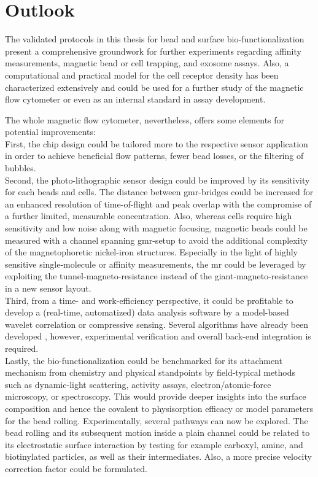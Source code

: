 \chapter{Outlook}
The validated protocols in this thesis for bead and surface bio-functionalization present a comprehensive groundwork for further experiments regarding affinity measurements, magnetic bead or cell trapping, and exosome assays. Also, a computational and practical model for the cell receptor density has been characterized extensively and could be used for a further study of the magnetic flow cytometer or even as an internal standard in assay development. 

The whole magnetic flow cytometer, nevertheless, offers some elements for potential improvements: \\
First, the chip design could be tailored more to the respective sensor application in order to achieve beneficial flow patterns, fewer bead losses, or the filtering of bubbles.\\
Second, the photo-lithographic sensor design could be improved by its sensitivity for each beads and cells. The distance between \gls{gmr}-bridges could be increased for an enhanced resolution of time-of-flight and peak overlap with the compromise of a further limited, measurable concentration. Also, whereas cells require high sensitivity and low noise along with magnetic focusing, magnetic beads could be measured with a channel spanning \gls{gmr}-setup to avoid the additional complexity of the magnetophoretic nickel-iron structures. Especially in the light of highly sensitive single-molecule or affinity measurements, the \acrlong{mr} could be leveraged by exploiting the tunnel-magneto-resistance instead of the giant-magneto-resistance in a new sensor layout.\cite{lit:GMRTMR}\\
Third, from a time- and work-efficiency perspective, it could be profitable to develop a (real-time, automatized) data analysis software by a model-based wavelet correlation or compressive sensing. Several algorithms have already been developed \cite{lit:thes:michaelBauer}, however, experimental verification and overall back-end integration is required.\\
Lastly, the bio-functionalization could be benchmarked for its attachment mechanism from chemistry and physical standpoints by field-typical methods such as dynamic-light scattering, activity assays, electron/atomic-force microscopy, or spectroscopy. This would provide deeper insights into the surface composition and hence the covalent to physisorption efficacy or model parameters for the bead rolling.
\clearpage
Experimentally, several pathways can now be explored. The bead rolling and its subsequent motion inside a plain channel could be related to its electrostatic surface interaction by testing for example \gls{carboxyl}, \gls{amine}, and biotinylated particles, as well as their intermediates. Also, a more precise velocity correction factor could be formulated.

